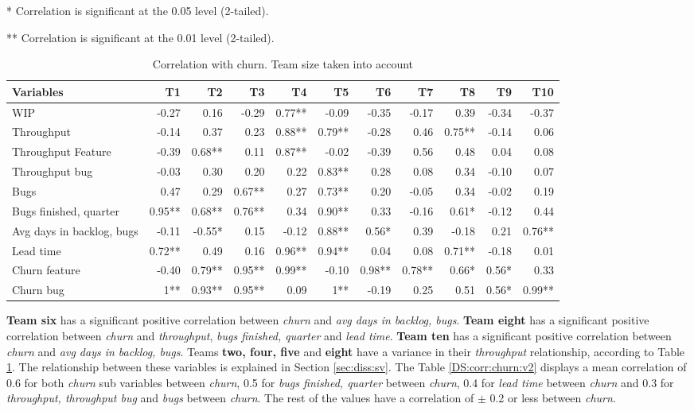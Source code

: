 \documentclass[UKenglish]{ifimaster}  %
\begin{document}
 \begin{table}[H]
\begin{adjustwidth}{-2cm}{}
 \caption{Correlation with churn. Team size taken into account}
 \centerline {* Correlation is significant at the 0.05 level (2-tailed).}
\centerline{** Correlation is significant at the 0.01 level (2-tailed).}
 \centering
 \begin{tabular}{|l|r|r|r|r|r|r|r|r|r|r|}
\hline
 \textbf{Variables} & \bf{T1} & \bf{T2} & \bf{T3} & \bf{T4} & \bf{T5} & \bf{T6} & \bf{T7} & \bf{T8} & \bf{T9} & \bf{T10}\\ \hline
 WIP  & -0.27 & 0.16 & -0.29 & 0.77** & -0.09 & -0.35 & -0.17 & 0.39 & -0.34 & -0.37 \\ \hline
 Throughput  & -0.14 & 0.37 & 0.23 & 0.88** & 0.79** & -0.28 & 0.46 & 0.75** & -0.14 & 0.06 \\ \hline
 Throughput Feature  & -0.39 & 0.68** & 0.11 & 0.87** & -0.02 & -0.39 & 0.56 & 0.48 & 0.04 & 0.08 \\ \hline
 Throughput bug  & -0.03 & 0.30 & 0.20 & 0.22 & 0.83** & 0.28 & 0.08 & 0.34 & -0.10 & 0.07 \\ \hline
 Bugs  & 0.47 & 0.29 & 0.67** & 0.27 & 0.73** & 0.20 & -0.05 & 0.34 & -0.02 & 0.19 \\ \hline
 Bugs finished, quarter  & 0.95** & 0.68** & 0.76** & 0.34 & 0.90** & 0.33 & -0.16 & 0.61* & -0.12 & 0.44 \\ \hline
 Avg days in backlog, bugs  & -0.11 & -0.55* & 0.15 & -0.12 & 0.88** & 0.56* & 0.39 & -0.18 & 0.21 & 0.76** \\ \hline
 Lead time  & 0.72** & 0.49 & 0.16 & 0.96** & 0.94** & 0.04 & 0.08 & 0.71** & -0.18 & 0.01 \\ \hline
 Churn feature  & -0.40 & 0.79** & 0.95** & 0.99** & -0.10 & 0.98** & 0.78** & 0.66* & 0.56* & 0.33 \\ \hline
 Churn bug  & 1** & 0.93** & 0.95** & 0.09 & 1** & -0.19 & 0.25 & 0.51 & 0.56* & 0.99** \\ \hline
\end{tabular}
 \label{corr:churn:v2}
\end{adjustwidth}
\end{table}
\textbf{Team six} has a significant positive correlation between \textit{churn} and  \textit{avg days in backlog, bugs}. \textbf{Team eight} has a significant positive correlation between \textit{churn} and  \textit{throughput}, \textit{bugs finished, quarter} and \textit{lead time}. \textbf{Team ten} has a significant positive correlation between \textit{churn} and  \textit{avg days in backlog, bugs}.  Teams \textbf{two, four, five} and \textbf{eight} have a variance in their \textit{throughput} relationship, according to Table \ref{corr:churn:v2}. The relationship between these variables is explained in Section \ref{sec:diss:sv}. The Table \ref{DS:corr:churn:v2} displays a mean correlation of 0.6 for both \textit{churn} sub variables between \textit{churn}, 0.5 for \textit{bugs finished, quarter} between \textit{churn}, 0.4 for \textit{lead time} between \textit{churn} and 0.3 for \textit{throughput, throughput bug} and \textit{bugs} between \textit{churn}. The rest of the values have a correlation of $\pm$ 0.2 or less between \textit{churn}.
\end{document}
